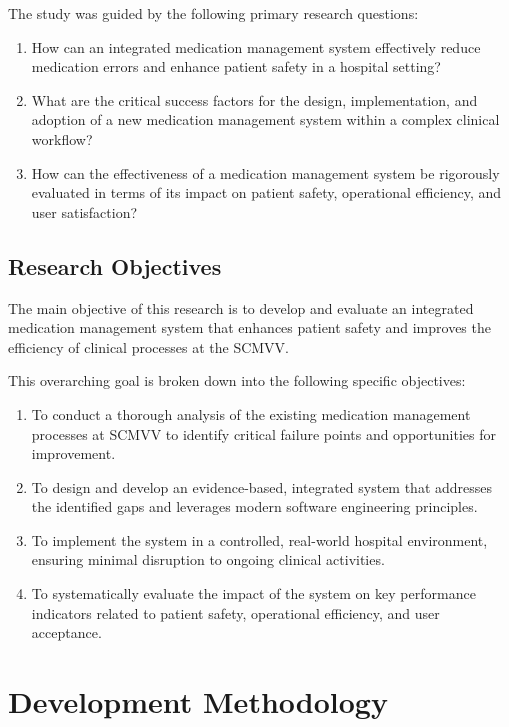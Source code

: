 The study was guided by the following primary research questions:

\begin{enumerate}
    \item How can an integrated medication management system effectively reduce medication errors and enhance patient safety in a hospital setting?
    \item What are the critical success factors for the design, implementation, and adoption of a new medication management system within a complex clinical workflow?
    \item How can the effectiveness of a medication management system be rigorously evaluated in terms of its impact on patient safety, operational efficiency, and user satisfaction?
\end{enumerate}

\subsection{Research Objectives}

The main objective of this research is to develop and evaluate an integrated medication management system that enhances patient safety and improves the efficiency of clinical processes at the SCMVV.

This overarching goal is broken down into the following specific objectives:
\begin{enumerate}
    \item To conduct a thorough analysis of the existing medication management processes at SCMVV to identify critical failure points and opportunities for improvement.
    \item To design and develop an evidence-based, integrated system that addresses the identified gaps and leverages modern software engineering principles.
    \item To implement the system in a controlled, real-world hospital environment, ensuring minimal disruption to ongoing clinical activities.
    \item To systematically evaluate the impact of the system on key performance indicators related to patient safety, operational efficiency, and user acceptance.
\end{enumerate}

\section{Development Methodology}


